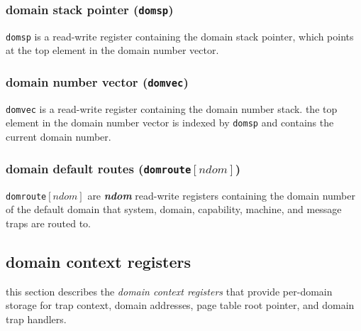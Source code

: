 \subsubsection{domain stack pointer (\texttt{domsp})}
\texttt{domsp} is a read-write register containing the domain stack
pointer, which points at the top element in the domain number vector.
\\

\subsubsection{domain number vector (\texttt{domvec})}
\texttt{domvec} is a read-write register containing the domain number
stack. the top element in the domain number vector is indexed by
\texttt{domsp} and contains the current domain number.
\\

\subsubsection{domain default routes (\texttt{domroute}$[\mathit{ndom}]$)}
\texttt{domroute}$[\mathit{ndom}]$ are \textbf{\emph{ndom}} read-write
registers containing the domain number of the default domain that system,
domain, capability, machine, and message traps are routed to.
\\

\newpage
\subsection{domain context registers}

this section describes the \emph{domain context registers} that provide
per-domain storage for trap context, domain addresses, page table
root pointer, and domain trap handlers.

